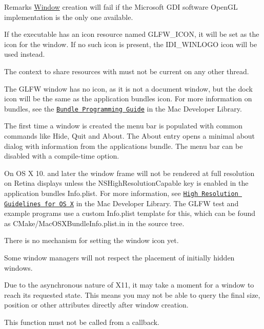 \begin{DoxyRemark}{Remarks}
\hyperlink{class_window}{Window} creation will fail if the Microsoft G\+DI software Open\+GL implementation is the only one available.

If the executable has an icon resource named {\ttfamily G\+L\+F\+W\+\_\+\+I\+C\+ON,} it will be set as the icon for the window. If no such icon is present, the {\ttfamily I\+D\+I\+\_\+\+W\+I\+N\+L\+O\+GO} icon will be used instead.

The context to share resources with must not be current on any other thread.

The G\+L\+FW window has no icon, as it is not a document window, but the dock icon will be the same as the application bundle\textquotesingle{}s icon. For more information on bundles, see the \href{https://developer.apple.com/library/mac/documentation/CoreFoundation/Conceptual/CFBundles/}{\tt Bundle Programming Guide} in the Mac Developer Library.

The first time a window is created the menu bar is populated with common commands like Hide, Quit and About. The About entry opens a minimal about dialog with information from the application\textquotesingle{}s bundle. The menu bar can be disabled with a compile-\/time option.

On OS X 10. and later the window frame will not be rendered at full resolution on Retina displays unless the {\ttfamily N\+S\+High\+Resolution\+Capable} key is enabled in the application bundle\textquotesingle{}s {\ttfamily Info.\+plist}. For more information, see \href{https://developer.apple.com/library/mac/documentation/GraphicsAnimation/Conceptual/HighResolutionOSX/Explained/Explained.html}{\tt High Resolution Guidelines for OS X} in the Mac Developer Library. The G\+L\+FW test and example programs use a custom {\ttfamily Info.\+plist} template for this, which can be found as {\ttfamily C\+Make/\+Mac\+O\+S\+X\+Bundle\+Info.\+plist.\+in} in the source tree.

There is no mechanism for setting the window icon yet.

Some window managers will not respect the placement of initially hidden windows.

Due to the asynchronous nature of X11, it may take a moment for a window to reach its requested state. This means you may not be able to query the final size, position or other attributes directly after window creation.
\end{DoxyRemark}
This function must not be called from a callback.

